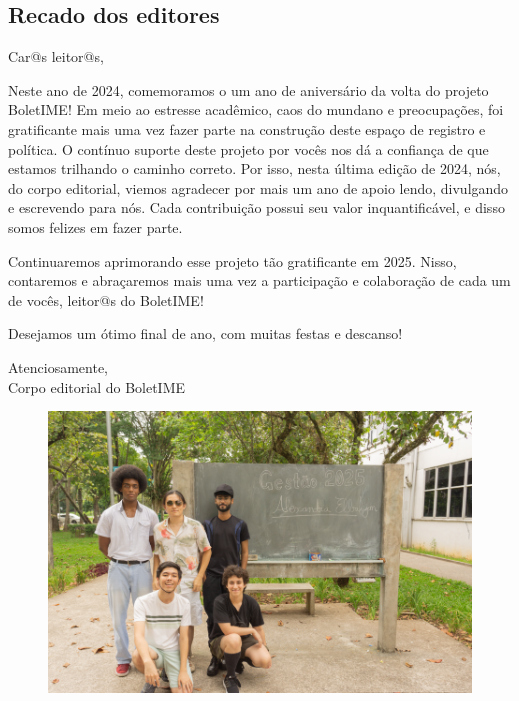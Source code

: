 \begin{adjustwidth}{2cm}{2cm}

{\centering \section*{Recado dos editores}}

Car@s leitor@s,

Neste ano de 2024, comemoramos o um ano de aniversário da volta do projeto BoletIME! Em meio ao estresse acadêmico, caos do mundano e preocupações, foi gratificante mais uma vez fazer parte na construção deste espaço de registro e política. O contínuo suporte deste projeto por vocês nos dá a confiança de que estamos trilhando o caminho correto. Por isso, nesta última edição de 2024, nós, do corpo editorial, viemos agradecer por mais um ano de apoio lendo, divulgando e escrevendo para nós. Cada contribuição possui seu valor inquantificável, e disso somos felizes em fazer parte.

Continuaremos aprimorando esse projeto tão gratificante em 2025. Nisso, contaremos e abraçaremos mais uma vez a participação e colaboração de cada um de vocês, leitor@s do BoletIME!

Desejamos um ótimo final de ano, com muitas festas e descanso!

Atenciosamente,\\
Corpo editorial do BoletIME

\vspace{1cm}

\begin{figure}[h]
    \centering
    \includegraphics[width=0.6\linewidth]{textos//img/gestao_2025.png}
\end{figure}

\end{adjustwidth}